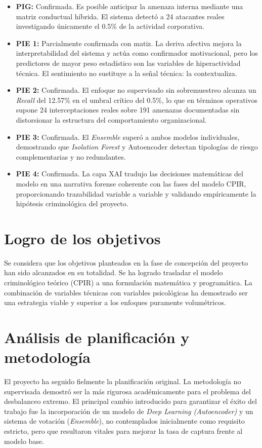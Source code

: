 \documentclass[IB]{TFUOC}%
\begin{document}
\begin{itemize}
    \item \textbf{PIG:} Confirmada. Es posible anticipar la amenaza interna 
    mediante una matriz conductual híbrida. El sistema detectó a 24 atacantes 
    reales investigando únicamente el 0.5\% de la actividad corporativa.
    
    \item \textbf{PIE 1:} Parcialmente confirmada con matiz. La deriva afectiva 
    mejora la interpretabilidad del sistema y actúa como confirmador 
    motivacional, pero los predictores de mayor peso estadístico son las 
    variables de hiperactividad técnica. El sentimiento no sustituye a la 
    señal técnica: la contextualiza.
    
    \item \textbf{PIE 2:} Confirmada. El enfoque no supervisado sin sobremuestreo 
    alcanza un \textit{Recall} del 12.57\% en el umbral crítico del 0.5\%, 
    lo que en términos operativos supone 24 interceptaciones reales sobre 
    191 amenazas documentadas sin distorsionar la estructura del comportamiento 
    organizacional.
    
    \item \textbf{PIE 3:} Confirmada. El \textit{Ensemble} superó a ambos 
    modelos individuales, demostrando que \textit{Isolation Forest} y 
    Autoencoder detectan tipologías de riesgo complementarias y no redundantes.
    
    \item \textbf{PIE 4:} Confirmada. La capa XAI tradujo las decisiones 
    matemáticas del modelo en una narrativa forense coherente con las fases 
    del modelo CPIR, proporcionando trazabilidad variable a variable y 
    validando empíricamente la hipótesis criminológica del proyecto.
\end{itemize}

\section{Logro de los objetivos}
Se considera que los objetivos planteados en la fase de concepción del proyecto han sido alcanzados en su totalidad. Se ha logrado trasladar el modelo criminológico teórico (CPIR) a una formulación matemática y programática. La combinación de variables técnicas con variables psicológicas ha demostrado ser una estrategia viable y superior a los enfoques puramente volumétricos.

\section{Análisis de planificación y metodología}
El proyecto ha seguido fielmente la planificación original. La metodología no supervisada demostró ser la más rigurosa académicamente para el problema del desbalanceo extremo. El principal cambio introducido para garantizar el éxito del trabajo fue la incorporación de un modelo de \textit{Deep Learning (Autoencoder)} y un sistema de votación (\textit{Ensemble}), no contemplados inicialmente como requisito estricto, pero que resultaron vitales para mejorar la tasa de captura frente al modelo base.
\end{document}

